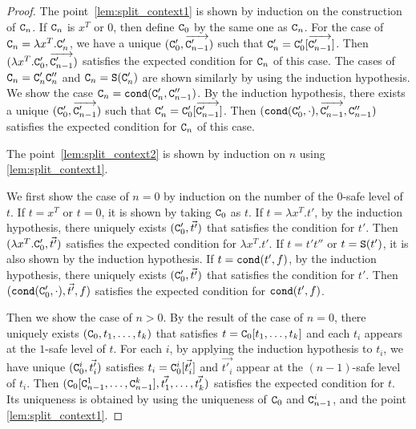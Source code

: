 \begin{proof}
  The point~\ref{lem:split_context1} is shown by induction on the construction of ${\tt C}_{n}$.
  If ${\tt C}_{n}$ is $x^T$ or $0$, then define ${\tt C}_{0}$ by the same one as ${\tt C}_{n}$. 
  For the case of ${\tt C}_{n} = \lambda x^T.{\tt C}_{n}'$, 
  we have a unique $({\tt C}_{0}',\overrightarrow{{\tt C}_{n-1}'})$ such that 
  ${\tt C}_{n}' = {\tt C}_{0}'[\overrightarrow{{\tt C}_{n-1}'}]$.
  Then $(\lambda x^T.{\tt C}_{0}',\overrightarrow{{\tt C}_{n-1}'})$
  satisfies the expected condition for ${\tt C}_{n}$ of this case. 
  The cases of ${\tt C}_{n} = {\tt C}_{n}'{\tt C}_{n}''$ and ${\tt C}_{n} = {\tt S}({\tt C}_{n}')$
  are shown similarly by using the induction hypothesis.
  We show the case ${\tt C}_{n} = {\tt cond}({\tt C}_{n}',{\tt C}_{n-1}'')$. 
  By the induction hypothesis, there exists a unique
  $({\tt C}_{0}',\overrightarrow{{\tt C}_{n-1}'})$ such that 
  ${\tt C}_{n}' = {\tt C}_{0}'[\overrightarrow{{\tt C}_{n-1}'}]$.
  Then $({\tt cond}({\tt C}_{0}',\cdot), \overrightarrow{{\tt C}_{n-1}'}, {\tt C}_{n-1}'')$
  satisfies the expected condition for ${\tt C}_{n}$ of this case. 
  
  The point~\ref{lem:split_context2} is shown
  by induction on $n$ using \ref{lem:split_context1}.

  We first show the case of $n=0$ by induction on the number of the $0$-safe level of $t$.
  If $t = x^T$ or $t = 0$, it is shown by taking ${\tt C}_{0}$ as $t$.
  If $t = \lambda x^T.t'$, by the induction hypothesis,
  there uniquely exists $({\tt C}_{0}',\vec{t'})$ that satisfies the condition for $t'$. 
  Then $(\lambda x^T.{\tt C}_{0}',\vec{t'})$ satisfies
  the expected condition for $\lambda x^T.t'$. 
  If $t =t't''$ or $t = {\tt S}(t')$, it is also shown by the induction hypothesis. 
  If $t = {\tt cond}(t',f)$, by the induction hypothesis, 
  there uniquely exists $({\tt C}_{0}',\vec{t'})$ that satisfies the condition for $t'$. 
  Then $({\tt cond}({\tt C}_{0}',\cdot),\vec{t'},f)$ satisfies
  the expected condition for ${\tt cond}(t',f)$. 

  Then we show the case of $n>0$.
  By the result of the case of $n=0$, there uniquely exists $({\tt C}_{0},t_1,\ldots,t_k)$
  that satisfies $t = {\tt C}_{0}[t_1,\ldots,t_k]$ and
  each $t_i$ appears at the $1$-safe level of $t$.
  For each $i$, by applying the induction hypothesis to $t_i$,
  we have unique $({\tt C}_{0}^i,\vec{t'_i})$
  satisfies $t_i = {\tt C}_{0}^i[\vec{t'_i}]$ and $\vec{t'_i}$ appear
  at the $(n-1)$-safe level of $t_i$. 
  Then $({\tt C}_{0}[{\tt C}_{n-1}^1,\ldots,{\tt C}_{n-1}^k],\vec{t'_1},\ldots,\vec{t'_k})$
  satisfies the expected condition for $t$.
  Its uniqueness is obtained by using the uniqueness of ${\tt C}_{0}$ and ${\tt C}_{n-1}^i$,
  and the point \ref{lem:split_context1}. 
\end{proof}

